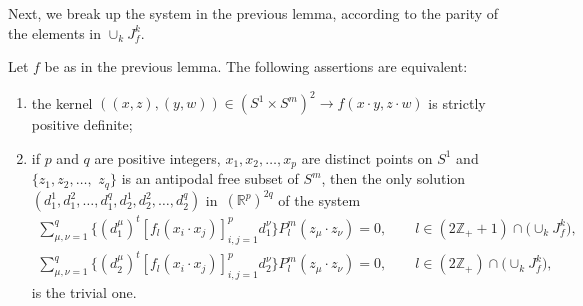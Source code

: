 Next, we break up the system in the previous lemma, according to the parity of the elements in $\cup_{k}J_f^k$.

\begin{Proposition} \label{evenodd}
Let $f$ be as in the previous lemma. The following assertions are equivalent:
\begin{enumerate}\itemsep=0pt
\item[$(i)$] the kernel $((x,z), (y,w)) \in (S^1 \times S^m)^2 \to f(x \cdot y, z \cdot w)$ is strictly positive definite;
\item[$(ii)$] if $p$ and $q$ are positive integers, $x_1,x_2, \ldots, x_p$ are distinct points on $S^1$ and $\{z_1, z_2, \ldots,$ $z_q\}$ is an antipodal free subset of $S^m$, then the only solution $(d_1^1, d_1^2,\ldots, d_1^q, d_2^1,d_2^2, \ldots, d_2^q)$ in~$(\mathbb{R}^{p})^{2q}$ of the system
\begin{gather*}
\sum_{\mu,\nu=1}^q \big\{(d_1^\mu)^t [f_l(x_i \cdot x_j)]_{i,j=1}^p d_1^\nu\big\} P_l^m(z_\mu \cdot z_\nu )=0, \qquad l\in (2\mathbb{Z}_++1) \cap \big(\cup_{k}J_f^k\big),\\
\sum_{\mu,\nu=1}^q \big\{(d_2^\mu)^t [f_l(x_i \cdot x_j)]_{i,j=1}^p d_2^\nu\big\} P_l^m(z_\mu \cdot z_\nu )=0, \qquad l\in (2\mathbb{Z}_+) \cap \big(\cup_{k}J_f^k\big),
\end{gather*}
is the trivial one.
\end{enumerate}
\end{Proposition}
